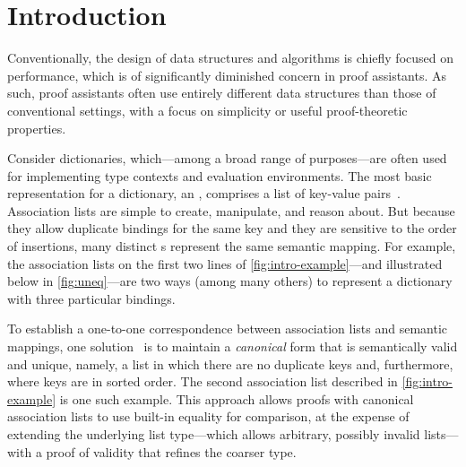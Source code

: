 \section{Introduction}
\label{sec:Introduction}


Conventionally, the design of data structures and algorithms is chiefly focused on performance, which is of significantly diminished concern in proof assistants.
%
As such, proof assistants often use entirely different data structures than those of conventional settings, with a focus on simplicity or useful proof-theoretic properties.

Consider dictionaries, which---among a broad range of purposes---are often used for implementing type contexts and evaluation environments.
%
The most basic representation for a dictionary, an \emph{\sal}, comprises a list of key-value pairs~\citep{XXX,XXX,XXX}.
%
Association lists are simple to create, manipulate, and reason about.
%
But because they allow duplicate bindings for the same key and they are sensitive to the order of insertions, many distinct \sal{}s represent the same semantic mapping.
%
For example, the association lists on the first two lines of \autoref{fig:intro-example}---and illustrated below in \autoref{fig:uneq}---are two ways (among many others) to represent a dictionary with three particular bindings.




To establish a one-to-one correspondence between association lists and semantic mappings, one solution~\citet{XXX,XXX,XXX} is to maintain a \emph{canonical} form that is semantically valid and unique, namely, a list in which there are no duplicate keys and, furthermore, where keys are in sorted order.
%
The second association list described in \autoref{fig:intro-example} is one such example.
%
This approach allows proofs with canonical association lists to use built-in equality for comparison, at the expense of extending the underlying list type---which allows arbitrary, possibly invalid lists---with a proof of validity that refines the coarser type.

